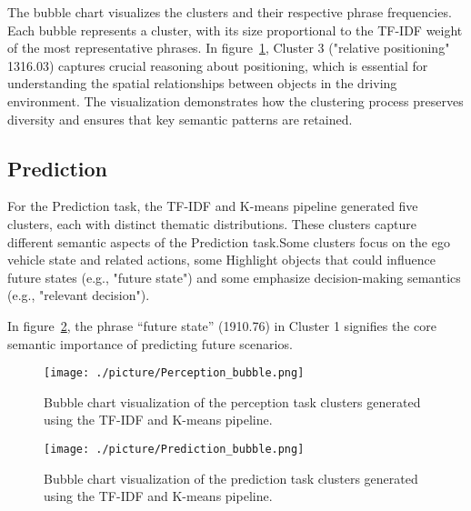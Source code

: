 The bubble chart visualizes the clusters and their respective phrase frequencies. Each bubble represents a cluster, with its size proportional to the TF-IDF weight of the most representative phrases. In figure~\ref{Perception_bubble}, Cluster 3 ("relative positioning" 1316.03) captures crucial reasoning about positioning, which is essential for understanding the spatial relationships between objects in the driving environment. The visualization demonstrates how the clustering process preserves diversity and ensures that key semantic patterns are retained.

\subsection{Prediction}
For the Prediction task, the TF-IDF and K-means pipeline generated five clusters, each with distinct thematic distributions. These clusters capture different semantic aspects of the Prediction task.Some clusters focus on the ego vehicle state and related actions, some Highlight objects that could influence future states (e.g., "future state") and some emphasize decision-making semantics (e.g., "relevant decision").

In figure~\ref{Prediction_bubble}, the phrase “future state” (1910.76) in Cluster 1 signifies the core semantic importance of predicting future scenarios. 
\begin{figure}
    \centering
    \texttt{[image: ./picture/Perception\_bubble.png]}
    \caption{Bubble chart visualization of the perception task clusters generated using the TF-IDF and K-means pipeline.}
    \label{Perception_bubble}
\end{figure}


\begin{figure}
    \centering
    \texttt{[image: ./picture/Prediction\_bubble.png]}
    \caption{Bubble chart visualization of the prediction task clusters generated using the TF-IDF and K-means pipeline.}
    \label{Prediction_bubble}
\end{figure}

